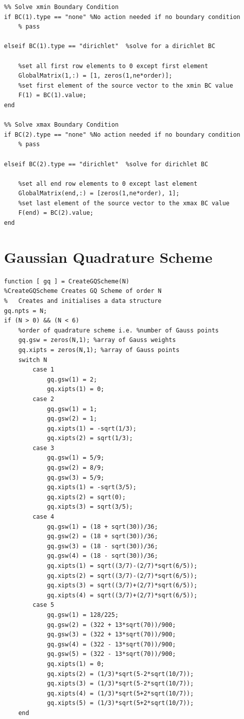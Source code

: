 \documentclass[11pt]{article}
\begin{document}
\begin{appendices}
\begin{lstlisting}
%% Solve xmin Boundary Condition 
if BC(1).type == "none" %No action needed if no boundary condition
    % pass 
    
elseif BC(1).type == "dirichlet"  %solve for a dirichlet BC
    
    %set all first row elements to 0 except first element  
    GlobalMatrix(1,:) = [1, zeros(1,ne*order)];   
    %set first element of the source vector to the xmin BC value
    F(1) = BC(1).value;
end

%% Solve xmax Boundary Condition
if BC(2).type == "none" %No action needed if no boundary condition
    % pass
    
elseif BC(2).type == "dirichlet"  %solve for dirichlet BC
    
    %set all end row elements to 0 except last element 
    GlobalMatrix(end,:) = [zeros(1,ne*order), 1];
    %set last element of the source vector to the xmax BC value
    F(end) = BC(2).value;
end

\end{lstlisting}
\pagebreak

\section{Gaussian Quadrature Scheme}\label{ap:LaplaceElem}

\begin{lstlisting}
function [ gq ] = CreateGQScheme(N)
%CreateGQScheme Creates GQ Scheme of order N
%   Creates and initialises a data structure
gq.npts = N;
if (N > 0) && (N < 6)
    %order of quadrature scheme i.e. %number of Gauss points
    gq.gsw = zeros(N,1); %array of Gauss weights
    gq.xipts = zeros(N,1); %array of Gauss points
    switch N
        case 1
            gq.gsw(1) = 2;
            gq.xipts(1) = 0;
        case 2
            gq.gsw(1) = 1;
            gq.gsw(2) = 1;
            gq.xipts(1) = -sqrt(1/3);
            gq.xipts(2) = sqrt(1/3);
        case 3
            gq.gsw(1) = 5/9;
            gq.gsw(2) = 8/9;
            gq.gsw(3) = 5/9;
            gq.xipts(1) = -sqrt(3/5);
            gq.xipts(2) = sqrt(0);
            gq.xipts(3) = sqrt(3/5);
        case 4
            gq.gsw(1) = (18 + sqrt(30))/36;
            gq.gsw(2) = (18 + sqrt(30))/36;
            gq.gsw(3) = (18 - sqrt(30))/36;
            gq.gsw(4) = (18 - sqrt(30))/36;
            gq.xipts(1) = sqrt((3/7)-(2/7)*sqrt(6/5));
            gq.xipts(2) = sqrt((3/7)-(2/7)*sqrt(6/5));
            gq.xipts(3) = sqrt((3/7)+(2/7)*sqrt(6/5));
            gq.xipts(4) = sqrt((3/7)+(2/7)*sqrt(6/5));
        case 5
            gq.gsw(1) = 128/225;
            gq.gsw(2) = (322 + 13*sqrt(70))/900;
            gq.gsw(3) = (322 + 13*sqrt(70))/900;
            gq.gsw(4) = (322 - 13*sqrt(70))/900;
            gq.gsw(5) = (322 - 13*sqrt(70))/900;
            gq.xipts(1) = 0;
            gq.xipts(2) = (1/3)*sqrt(5-2*sqrt(10/7));
            gq.xipts(3) = (1/3)*sqrt(5-2*sqrt(10/7));
            gq.xipts(4) = (1/3)*sqrt(5+2*sqrt(10/7));
            gq.xipts(5) = (1/3)*sqrt(5+2*sqrt(10/7));
    end
    

\end{lstlisting}
\end{appendices}
\end{document}
